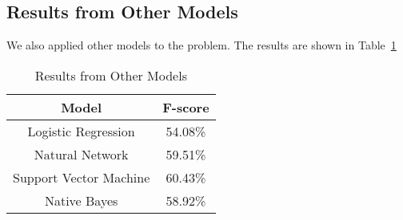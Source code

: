 \subsection{Results from Other Models}
We also applied other models to the problem.
 The results are shown in Table~\ref{table:others}

\begin{table}
\begin{center}
\begin{tabular}{|c|c|}
\hline
Model & F-score \\ \hline
Logistic Regression & 54.08\% \\ \hline
Natural Network & 59.51\% \\ \hline
Support Vector Machine & 60.43\% \\ \hline
Native Bayes & 58.92\% \\ \hline
\end{tabular}
\caption{Results from Other Models}
\label{table:others}
\end{center}
\end{table}


